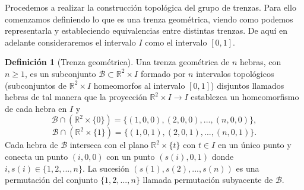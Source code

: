 \documentclass[12pt]{book}
\theoremstyle{definition}
\newtheorem{defi}{Definición}[section]
\begin{document}

Procedemos a realizar la construcción topológica del grupo de trenzas. Para ello comenzamos definiendo lo que es una trenza geométrica, viendo como podemos representarla y estableciendo equivalencias entre distintas trenzas. De aquí en adelante consideraremos el intervalo $I$ como el intervalo $[0,1]$.


\begin{defi}[Trenza geométrica]\label{trenza_geom}
Una trenza geométrica de $n$ hebras, con $n \geq 1$, es un subconjunto $\mathcal{B}\subset\mathbb{R}^2\times I$ formado por $n$ intervalos topológicos (subconjuntos de $\mathbb{R}^2\times I$ homeomorfos al intervalo $[0,1]$) disjuntos llamados hebras de tal manera que la proyección $\mathbb{R}^2\times I\rightarrow I$ establezca un homeomorfismo de cada hebra en $I$ y
$$\mathcal{B}\cap(\mathbb{R}^2\times \{0\})=\{(1,0,0),(2,0,0),...,(n,0,0)\},$$
$$\mathcal{B}\cap(\mathbb{R}^2\times \{1\})=\{(1,0,1),(2,0,1),...,(n,0,1)\}.$$
Cada hebra de $\mathcal{B}$ interseca con el plano $\mathbb{R}^2\times \{t\}$ con $t\in I$ en un único punto y conecta un punto $(i,0,0)$ con un punto $(s(i),0,1)$ donde $i,s(i)\in\{1,2,...,n\}$. La sucesión $(s(1),s(2),...,s(n))$ es una permutación del conjunto $\{1,2,...,n\}$ llamada permutación subyacente de $\mathcal{B}$.
\end{defi}
\end{document}
